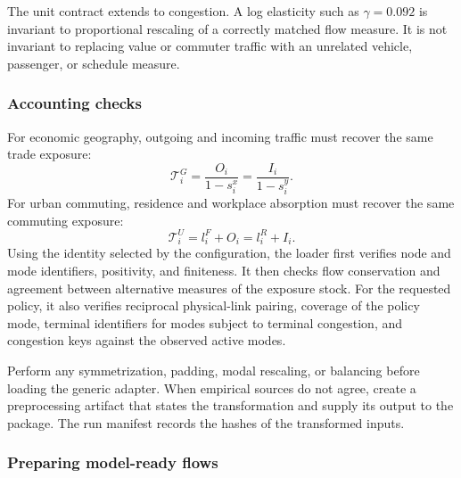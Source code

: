 The unit contract extends to congestion. A log elasticity such as
\(\gamma=0.092\) is invariant to proportional rescaling of a correctly
matched flow measure. It is not invariant to replacing value or commuter
traffic with an unrelated vehicle, passenger, or schedule measure.

\subsubsection{Accounting checks}

For economic geography, outgoing and incoming traffic must recover the same
trade exposure:
\[
 \mathcal T_i^G=\frac{O_i}{1-s_i^x}
               =\frac{I_i}{1-s_i^y}.
\]
For urban commuting, residence and workplace absorption must recover the same
commuting exposure:
\[
 \mathcal T_i^U=l_i^F+O_i=l_i^R+I_i.
\]
Using the identity selected by the configuration, the loader first verifies
node and mode identifiers, positivity, and finiteness. It then checks flow
conservation and agreement between alternative measures of the exposure stock.
For the requested policy, it also verifies reciprocal physical-link pairing,
coverage of the policy mode, terminal identifiers for modes subject to terminal
congestion, and congestion keys against the observed active modes.

Perform any symmetrization, padding, modal rescaling, or balancing before
loading the generic adapter. When empirical sources do not agree, create a
preprocessing artifact that states the transformation and supply its output to
the package. The run manifest records the hashes of the transformed inputs.

\subsubsection{Preparing model-ready flows}

